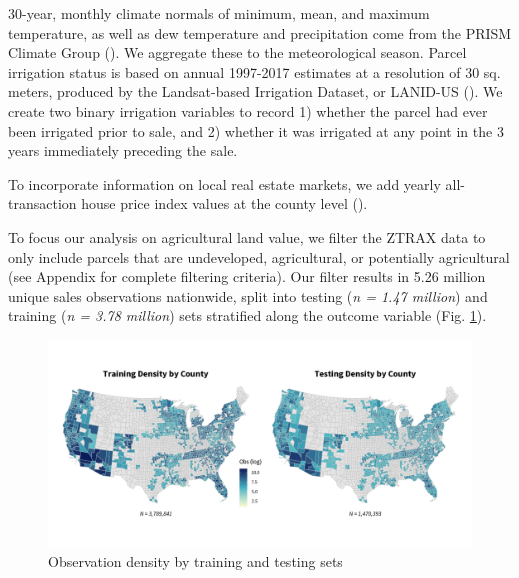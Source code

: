 \documentclass[12pt]{article}
\begin{document}
30-year, monthly climate normals of minimum, mean, and maximum temperature, as well as dew temperature and precipitation come from the PRISM Climate Group (\cite{PRISMClimate2021}). We aggregate these to the meteorological season. Parcel irrigation status is based on annual 1997-2017 estimates at a resolution of 30 sq. meters, produced by the Landsat-based Irrigation Dataset, or LANID-US (\cite{Xie2021MappingStates}). We create two binary irrigation variables to record 1) whether the parcel had ever been irrigated prior to sale, and 2) whether it was irrigated at any point in the 3 years immediately preceding the sale. 

To incorporate information on local real estate markets, we add yearly all-transaction house price index values at the county level (\cite{FederalHousing2022}). 

To focus our analysis on agricultural land value, we filter the ZTRAX data to only include parcels that are undeveloped, agricultural, or potentially agricultural (see Appendix for complete filtering criteria).
Our filter results in 5.26 million unique sales observations nationwide, split into testing (\textit{n = 1.47 million}) and training (\textit{n = 3.78 million}) sets stratified along the outcome variable (Fig. \ref{fig:train_test}). 

\begin{figure}
    \centering
    \includegraphics[width=1\textwidth]{archive/figures/test_train_density.png}
    \caption{Observation density by training and testing sets}
    \label{fig:train_test}
\end{figure}
\end{document}

